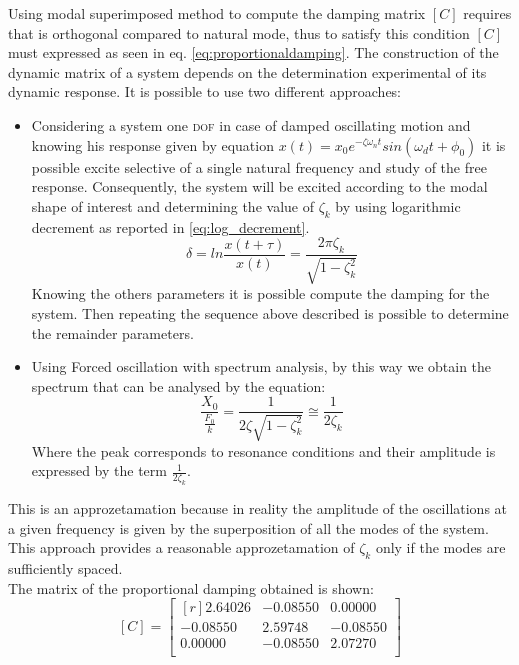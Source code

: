 Using modal superimposed method to compute the damping matrix \([C]\) requires 
that is orthogonal compared to natural mode, thus to satisfy this condition 
\([C]\) must expressed as seen in eq. \eqref{eq:proportionaldamping}.
The construction of the dynamic matrix of a system depends on the 
determination experimental of its dynamic response.
It is possible to use two different approaches:
\begin{itemize}
\item Considering a system one \textsc{dof} in case of damped oscillating 
motion and knowing his response given by equation
\(x(t) = x_{0} e^{-\zeta\omega_{n}t}sin(\omega_dt+\phi_0)\) it is possible excite 
selective of a single natural frequency and study of the free response. 
Consequently, the system will be excited according to the modal shape 
of interest and determining the value of \(\zeta_{k}\) by using logarithmic 
decrement as reported 
in \eqref{eq:log_decrement}.
\begin{equation}
\label{eq:log_decrement}
\delta = ln\frac{x(t+\tau)}{x(t)} = \frac{2\pi\zeta_{k}}{\sqrt{1-\zeta_{k}^2}}
\end{equation}
Knowing the others parameters it is possible compute the damping for the system. 
Then repeating the sequence above described is possible to determine the remainder
 parameters. 
\item Using Forced oscillation with spectrum analysis, by this way we obtain 
the spectrum that can be analysed by the equation:
\begin{equation}
\label{eq:analysis_spectrum}
\frac{X_{0}}{\frac{F_{0}}{k}} = \frac{1}{2\zeta\sqrt{1-\zeta^2_{k}}} \cong \frac{1}{2\zeta_{k}}
\end{equation}
Where the peak corresponds to resonance conditions and their amplitude is 
expressed by the term \(\frac{1}{2\zeta_{k}}\).
\end{itemize}
This is an approzetamation because in reality the amplitude of the oscillations 
at a given frequency is given by the superposition of all the modes of the 
system. This approach provides a reasonable approzetamation of \(\zeta_{k}\) only 
if the modes are sufficiently spaced.\\
The matrix of the proportional damping obtained is shown:
\begin{equation}
\label{eq:c-matrix}
	[C] =
	\begin{bmatrix*}[r]
		 2.64026		&	-0.08550		 & 	 0.00000 	\\
		-0.08550 	&	 2.59748		 &	-0.08550		\\
		 0.00000 	&	-0.08550		 &	 2.07270		\\
	\end{bmatrix*}
\end{equation}
%

